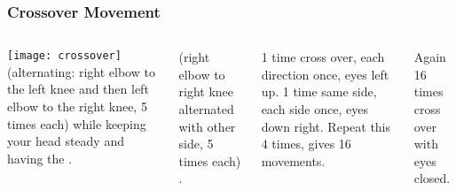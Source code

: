 \documentclass[../main.tex]{subfiles}
\begin{document}
\begin{frame}
\frametitle{Crossover Movement}


\begin{columns}[c] %

\texttt{[image: crossover]}
\textbf<1, 4>{} (alternating: right elbow to the left knee and then left elbow to the right knee, 5 times each) while keeping your head steady and having the . \pause

\textbf<2, 4>{} (right elbow to right knee alternated with other side, 5 times each) . \pause

\textbf<3, 4>{} 1 time cross over, each direction once, eyes left up. 1 time same side, each side once, eyes down right. Repeat this 4 times, gives 16 movements. \pause
 
\textbf<4>{} Again 16 times cross over with eyes closed.

\end{columns}
\end{frame}
\end{document}
